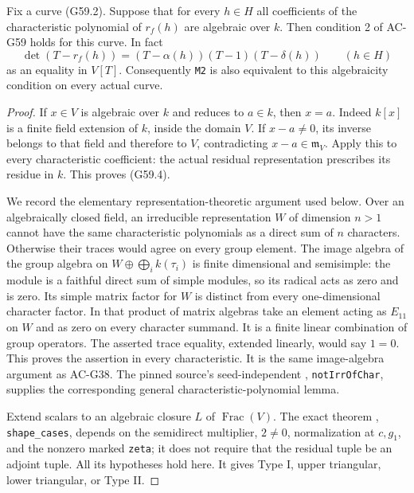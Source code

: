 \begin{lemma}
\label{AC-G59-polynomials}
Fix a curve (G59.2).  Suppose that for every \(h\in H\)
all coefficients of the characteristic polynomial of
\(r_f(h)\) are algebraic over \(k\).
Then condition 2 of AC-G59 holds for this curve.
In fact
\[
 \det(T-r_f(h))
       =(T-\alpha(h))(T-1)(T-\delta(h))
                         \qquad(h\in H)
                                                               \tag{G59.4}
\]
as an equality in \(V[T]\).
Consequently \texttt{M2} is also equivalent to this
algebraicity condition on every actual curve.
\end{lemma}
\begin{proof}
If \(x\in V\) is algebraic over \(k\) and reduces to
\(a\in k\), then \(x=a\).
Indeed \(k[x]\) is a finite field extension of \(k\),
inside the domain \(V\).
If \(x-a\ne0\), its inverse belongs to that field
and therefore to \(V\), contradicting
\(x-a\in\mathfrak m_V\).
Apply this to every characteristic coefficient:
the actual residual representation prescribes its
residue in \(k\).
This proves (G59.4).

We record the elementary representation-theoretic
argument used below.
Over an algebraically closed field, an irreducible
representation \(W\) of dimension \(n>1\) cannot have
the same characteristic polynomials as a direct sum
of \(n\) characters.
Otherwise their traces would agree on every group
element.
The image algebra of the group algebra on
\(W\oplus\bigoplus_i k(\tau_i)\) is finite dimensional
and semisimple: the module is a faithful direct sum
of simple modules, so its radical acts as zero and
is zero.
Its simple matrix factor for \(W\) is distinct from
every one-dimensional character factor.
In that product of matrix algebras take an element
acting as \(E_{11}\) on \(W\) and as zero on every
character summand.
It is a finite linear combination of group operators.
The asserted trace equality, extended linearly,
would say \(1=0\).
This proves the assertion in every characteristic.
It is the same image-algebra argument as AC-G38.
The pinned source's seed-independent
,
\texttt{notIrrOfChar}, supplies the corresponding
general characteristic-polynomial lemma.

Extend scalars to an algebraic closure \(L\) of
\(\operatorname{Frac}(V)\).
The exact theorem
,
\texttt{shape\_cases}, depends on the semidirect
multiplier, \(2\ne0\), normalization at \(c,g_1\),
and the nonzero marked \texttt{zeta}; it does not
require that the residual tuple be an adjoint tuple.
All its hypotheses hold here.
It gives Type I, upper triangular, lower triangular,
or Type II.


\end{proof}
